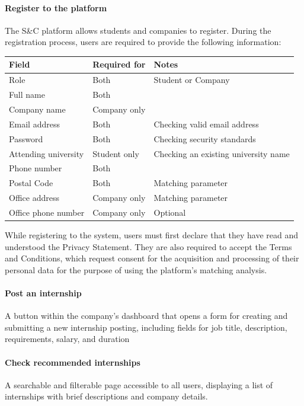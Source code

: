 \paragraph{Register to the platform}
The S\&C platform allows students and companies to register. During the registration process, users are required to provide the following information:
\begin{center}
\renewcommand{\arraystretch}{1}
\begin{tabular}{|p{5cm}|p{5cm}|p{5cm}|}
\hline
\textbf{Field} & \textbf{Required for} & \textbf{Notes} \\
\hline
Role & Both & Student or Company \\
\hline
Full name & Both &  \\
\hline
Company name & Company only &  \\
\hline
Email address & Both & Checking valid email address \\
\hline
Password & Both & Checking security standards \\
\hline
Attending university & Student only & Checking an existing university name \\
\hline
Phone number & Both &  \\
\hline
Postal Code & Both & Matching parameter \\
\hline
Office address & Company only & Matching parameter \\
\hline
Office phone number & Company only & Optional \\
\hline
\end{tabular}
\end{center}

While registering to the system, users must first declare that they have read and understood the Privacy Statement. They are also required to accept the Terms and Conditions, which request consent for the acquisition and processing of their personal data for the purpose of using the platform's matching analysis.

\paragraph{Post an internship}A button within the company's dashboard that opens a form for creating and submitting a new internship posting, including fields for job title, description, requirements, salary, and duration

\paragraph{Check recommended internships}A searchable and filterable page accessible to all users, displaying a list of internships with brief descriptions and company details.
